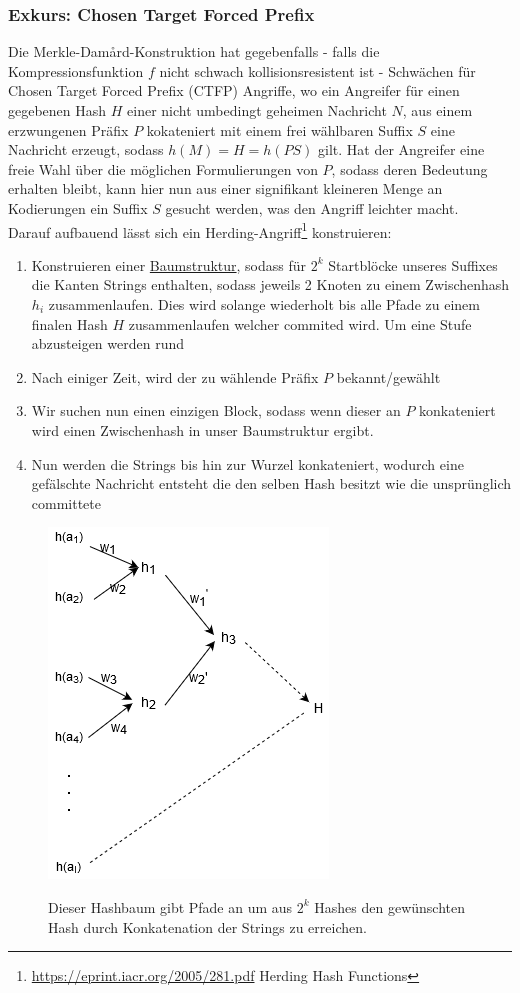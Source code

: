 \documentclass[a4paper,12pt]{article}
\begin{document}
\subsubsection{Exkurs: Chosen Target Forced Prefix}
Die Merkle-Dam\r{a}rd-Konstruktion hat gegebenfalls - falls die Kompressionsfunktion $f$ nicht schwach kollisionsresistent ist - Schwächen für Chosen Target Forced Prefix (CTFP) Angriffe, wo ein Angreifer für einen gegebenen Hash $H$ einer nicht umbedingt geheimen Nachricht $N$, aus einem erzwungenen Präfix $P$ kokateniert mit einem frei wählbaren Suffix $S$ eine Nachricht erzeugt, sodass $h(M)=H=h(PS)$ gilt. Hat der Angreifer eine freie Wahl über die möglichen Formulierungen von $P$, sodass deren Bedeutung erhalten bleibt, kann hier nun aus einer signifikant kleineren Menge an Kodierungen ein Suffix $S$ gesucht werden, was den Angriff leichter macht.\\
Darauf aufbauend lässt sich ein Herding-Angriff\footnote{\url{https://eprint.iacr.org/2005/281.pdf} Herding Hash Functions} konstruieren:
\begin{enumerate}
\item Konstruieren einer \hyperref[pic:herdingattack]{Baumstruktur}, sodass für $2^k$ Startblöcke unseres Suffixes die Kanten Strings enthalten, sodass jeweils 2 Knoten zu einem Zwischenhash $h_i$ zusammenlaufen. Dies wird solange wiederholt bis alle Pfade zu einem finalen Hash $H$ zusammenlaufen welcher commited wird. Um eine Stufe abzusteigen werden rund
\item Nach einiger Zeit, wird der zu wählende Präfix $P$ bekannt/gewählt
\item Wir suchen nun einen einzigen Block, sodass wenn dieser an $P$ konkateniert wird einen Zwischenhash in unser Baumstruktur ergibt.
\item Nun werden die Strings bis hin zur Wurzel konkateniert, wodurch eine gefälschte Nachricht entsteht die den selben Hash besitzt wie die unsprünglich committete 
\end{enumerate}

\begin{figure}
\centering
\includegraphics[scale=0.6]{Grafiken/HerdingAttack.png}
\label{pic:herdingattack}
\caption{Dieser Hashbaum gibt Pfade an um aus $2^k$ Hashes den gewünschten Hash durch Konkatenation der Strings zu erreichen.}
\end{figure}
\end{document}
